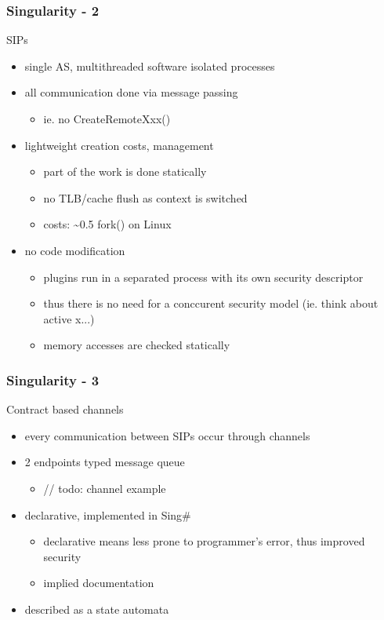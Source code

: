 \begin{frame}
  \frametitle{Singularity - 2}
  SIPs
  \begin{itemize}
    \item single AS, multithreaded software isolated processes
    \item all communication done via message passing
      \begin{itemize} \item ie. no CreateRemoteXxx() \end{itemize}
    \item lightweight creation costs, management
      \begin{itemize}
	\item part of the work is done statically
	\item no TLB/cache flush as context is switched
	\item costs: \textasciitilde 0.5 fork() on Linux
      \end{itemize}
    \item no code modification
      \begin{itemize}
	\item plugins run in a separated process with its own security descriptor
	\item thus there is no need for a conccurent security model (ie. think about active x...)
	\item memory accesses are checked statically
      \end{itemize}
  \end{itemize}
\end{frame}

\begin{frame}
  \frametitle{Singularity - 3}
  Contract based channels
  \begin{itemize}
    \item every communication between SIPs occur through channels
    \item 2 endpoints typed message queue
      \begin{itemize} \item // todo: channel example \end{itemize}
    \item declarative, implemented in Sing\#
      \begin{itemize}
        \item declarative means less prone to programmer's error, thus improved security
        \item implied documentation
      \end{itemize}
    \item described as a state automata
  \end{itemize}
\end{frame}


